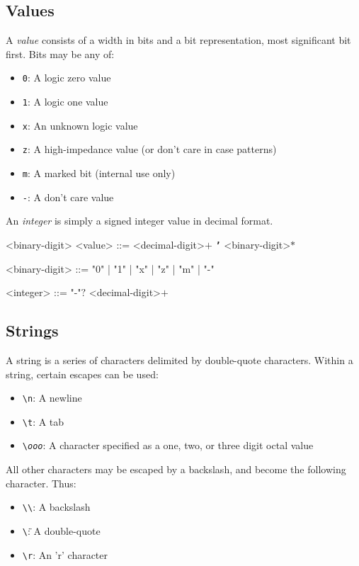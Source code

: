 \subsection{Values}

A \textit{value} consists of a width in bits and a bit representation, most significant bit first. Bits may be any of:
\begin{itemize}
    \item \texttt{0}: A logic zero value
    \item \texttt{1}: A logic one value
    \item \texttt{x}: An unknown logic value
    \item \texttt{z}: A high-impedance value (or don't care in case patterns)
    \item \texttt{m}: A marked bit (internal use only)
    \item \texttt{-}: A don't care value
\end{itemize}

An \textit{integer} is simply a signed integer value in decimal format.

\begin{indentgrammar}{<binary-digit>}
<value> ::= <decimal-digit>$+$ \texttt{\textbf{'}} <binary-digit>$*$

<binary-digit> ::= "0" | "1" | "x" | "z" | "m" | "-"

<integer> ::= "-"$?$ <decimal-digit>$+$
\end{indentgrammar}

\subsection{Strings}

A string is a series of characters delimited by double-quote characters. Within a string, certain escapes can be used:

\begin{itemize}
    \item \texttt{\textbackslash n}: A newline
    \item \texttt{\textbackslash t}: A tab
    \item \texttt{\textbackslash \textit{ooo}}: A character specified as a one, two, or three digit octal value
\end{itemize}

All other characters may be escaped by a backslash, and become the following character. Thus:

\begin{itemize}
    \item \texttt{\textbackslash \textbackslash}: A backslash
    \item \texttt{\textbackslash \"}: A double-quote
    \item \texttt{\textbackslash r}: An 'r' character
\end{itemize}

